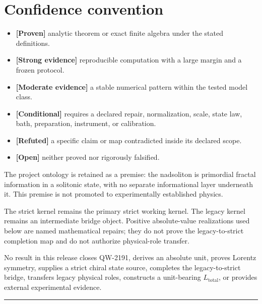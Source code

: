 \documentclass[11pt,a4paper,openany]{report}
\newcommand{\statusProven}{\textcolor{fingreen}{[Proven]}}
\newcommand{\statusStrong}{\textcolor{finblue}{[Strong evidence]}}
\newcommand{\statusModerate}{\textcolor{finviolet}{[Moderate evidence]}}
\newcommand{\statusConditional}{\textcolor{finorange}{[Conditional]}}
\newcommand{\statusRefuted}{\textcolor{finred}{[Refuted]}}
\newcommand{\statusOpen}{\textcolor{finviolet}{[Open]}}
\begin{document}
\tableofcontents
\clearpage
{}

\section{Confidence convention}

\begin{itemize}
\item 
\textbf{\statusProven{}} analytic theorem or exact finite algebra under the stated definitions.

\item 
\textbf{\statusStrong{}} reproducible computation with a large margin and a frozen protocol.

\item 
\textbf{\statusModerate{}} a stable numerical pattern within the tested model class.

\item 
\textbf{\statusConditional{}} requires a declared repair, normalization, scale, state law, bath, preparation, instrument, or calibration.

\item 
\textbf{\statusRefuted{}} a specific claim or map contradicted inside its declared scope.

\item 
\textbf{\statusOpen{}} neither proved nor rigorously falsified.

\end{itemize}

The project ontology is retained as a premise: the nadsoliton is primordial fractal information in a solitonic state, with no separate informational layer underneath it. This premise is not promoted to experimentally established physics.

The strict kernel remains the primary strict working kernel. The legacy kernel remains an intermediate bridge object. Positive absolute-value realizations used below are named mathematical repairs; they do not prove the legacy-to-strict completion map and do not authorize physical-role transfer.

No result in this release closes QW-2191, derives an absolute unit, proves Lorentz symmetry, supplies a strict chiral state source, completes the legacy-to-strict bridge, transfers legacy physical roles, constructs a unit-bearing \(L_{\mathrm{total}}\), or provides external experimental evidence.

\par\medskip\hrule\medskip
\end{document}
